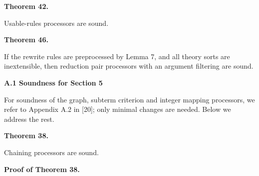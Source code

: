 \documentclass[10pt,a4paper]{amsart}
\begin{document}
 

 
\par\medskip\noindent\textbf{Theorem 42.}\par
 
 
Usable-rules processors are sound.\par
 
 

 
\par\medskip\noindent\textbf{Theorem 46.}\par
 
 
If the rewrite rules are preprocessed by Lemma 7, and all theory sorts are inextensible, then reduction pair processors with an argument filtering are sound.\par
 
 

 
\par\medskip\noindent\textbf{A.1 Soundness for Section 5}\par
 
 
For soundness of the graph, subterm criterion and integer mapping processors, we refer to Appendix A.2 in [20]; only minimal changes are needed. Below we address the rest.\par
 
 
 
\par\medskip\noindent\textbf{Theorem 38.}\par
 
 
Chaining processors are sound.\par
 
 
 
 
\par\medskip\noindent\textbf{Proof of Theorem 38.}\par
 
\end{document}
